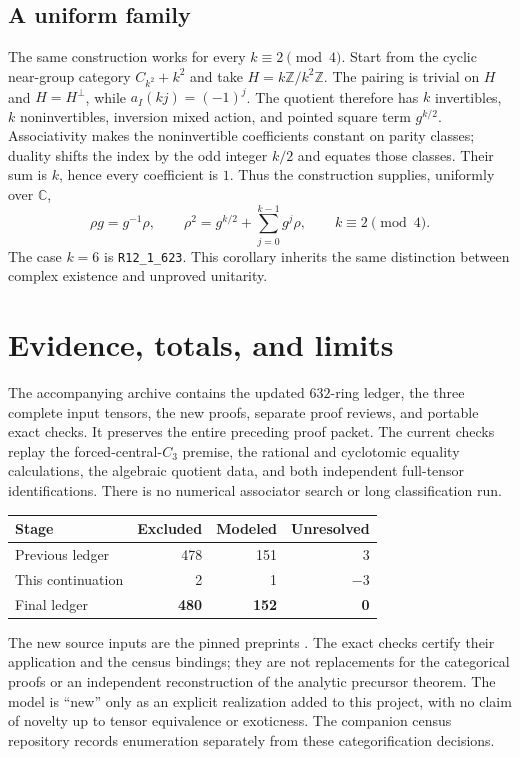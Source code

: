 \documentclass[11pt]{article}
\newcommand{\R}[1]{\texttt{R12\_1\_#1}}
\newcommand{\C}{\mathbb C}
\newcommand{\Z}{\mathbb Z}
\begin{document}
\subsection{A uniform family}
The same construction works for every $k\equiv2\pmod4$. Start from
the cyclic near-group category $C_{k^2}+k^2$ and take
$H=k\Z/k^2\Z$. The pairing is trivial on $H$ and $H=H^\perp$,
while $a_I(kj)=(-1)^j$. The quotient therefore has $k$ invertibles,
$k$ noninvertibles, inversion mixed action, and pointed square term
$g^{k/2}$. Associativity makes the noninvertible coefficients constant
on parity classes; duality shifts the index by the odd integer $k/2$
and equates those classes. Their sum is $k$, hence every coefficient
is $1$. Thus the construction supplies, uniformly over $\C$,
\[
 \rho g=g^{-1}\rho,\qquad
 \rho^2=g^{k/2}+\sum_{j=0}^{k-1}g^j\rho,
 \qquad k\equiv2\pmod4.
\]
The case $k=6$ is \R{623}. This corollary inherits the same
distinction between complex existence and unproved unitarity.

\section{Evidence, totals, and limits}
The accompanying archive contains the updated $632$-ring ledger, the
three complete input tensors, the new proofs, separate proof reviews,
and portable exact checks. It preserves the entire preceding proof
packet. The current checks replay the forced-central-$C_3$ premise,
the rational and cyclotomic equality calculations, the algebraic
quotient data, and both independent full-tensor identifications.
There is no numerical associator search or long classification run.

\begin{center}
\begin{tabular}{lrrr}\toprule
Stage&Excluded&Modeled&Unresolved\\\midrule
Previous ledger&478&151&3\\
This continuation&2&1&$-3$\\
Final ledger&\textbf{480}&\textbf{152}&\textbf{0}\\\bottomrule
\end{tabular}
\end{center}
The new source inputs are the pinned preprints \cite{Sch26,TPE}.
The exact checks certify their application and the census bindings;
they are not replacements for the categorical proofs or an independent
reconstruction of the analytic precursor theorem. The model is
``new'' only as an explicit realization added to this project, with no
claim of novelty up to tensor equivalence or exoticness.
The companion census repository records enumeration separately from these categorification decisions.
\end{document}
